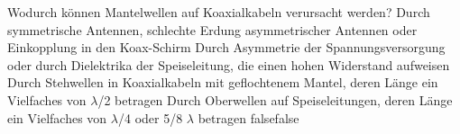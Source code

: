     {Wodurch können Mantelwellen auf Koaxialkabeln verursacht werden?}
    {Durch symmetrische Antennen, schlechte Erdung asymmetrischer Antennen oder Einkopplung in den Koax-Schirm}
    {Durch Asymmetrie der Spannungsversorgung oder durch Dielektrika der Speiseleitung, die einen hohen Widerstand aufweisen}
    {Durch Stehwellen in Koaxialkabeln mit geflochtenem Mantel, deren Länge ein Vielfaches von $\lambda$/2 betragen}
    {Durch Oberwellen auf Speiseleitungen, deren Länge ein Vielfaches von $\lambda$/4 oder 5/8 $\lambda$ betragen}
    {false}{false}